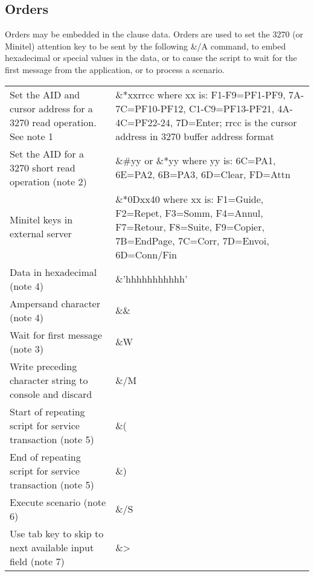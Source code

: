 \documentclass[letterpaper,10pt,english]{sphinxmanual}
\begin{document}
\subsection{Orders}
\label{\detokenize{connectivity_guide:orders}}
Orders may be embedded in the clause data. Orders are used to set the 3270 (or Minitel) attention key to be sent by the following \&/A command, to embed hexadecimal or special values in the data, or to cause the script to wait for the first message from the application, or to process a scenario.


\begin{savenotes}\sphinxattablestart
\centering
\begin{tabulary}{\linewidth}[t]{|T|T|}
\hline
{}\relax &\relax \\
\hline
Set the AID and cursor address for a 3270
read operation. See note 1
&
\&*xxrrcc where xx is:
F1-F9=PF1-PF9, 7A-7C=PF10-PF12, C1-C9=PF13-PF21, 4A-4C=PF22-24, 7D=Enter;
rrcc is the cursor address in 3270 buffer address format
\\
\hline
Set the AID for a 3270 short read operation (note 2)
&
\&\#yy or \&*yy where yy is:
6C=PA1, 6E=PA2, 6B=PA3,
6D=Clear, FD=Attn
\\
\hline
Minitel keys in external server
&
\&*0Dxx40 where xx is:
F1=Guide, F2=Repet, F3=Somm, F4=Annul, F7=Retour, F8=Suite, F9=Copier,
7B=EndPage, 7C=Corr, 7D=Envoi, 6D=Conn/Fin
\\
\hline
Data in hexadecimal (note 4)
&
\&’hhhhhhhhhhh’
\\
\hline
Ampersand character (note 4)
&
\&\&
\\
\hline
Wait for first message (note 3)
&
\&W
\\
\hline
Write preceding character string to console and discard
&
\&/M
\\
\hline
Start of repeating script for service transaction (note 5)
&
\&(
\\
\hline
End of repeating script for service transaction (note 5)
&
\&)
\\
\hline
Execute scenario (note 6)
&
\&/S
\\
\hline
Use tab key to skip to next available input field (note 7)
&
\&\textgreater{}
\\
\hline
\end{tabulary}
\par
\sphinxattableend\end{savenotes}
\end{document}
